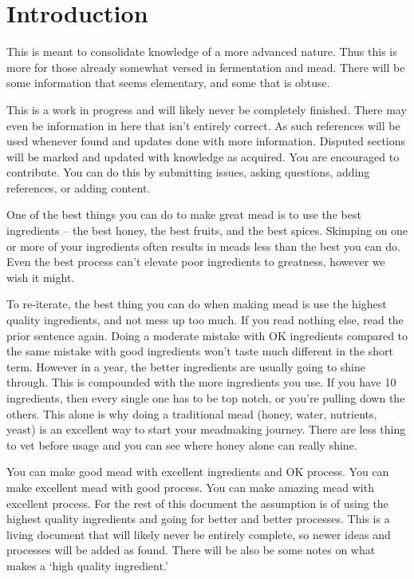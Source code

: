 \section{Introduction}
 This is meant to consolidate knowledge of a more advanced nature. Thus this is more for those already somewhat 
 versed in fermentation and mead. There will be some information that seems elementary, and some that is obtuse.

 This is a work in progress and will likely never be completely finished. There may even be information in
 here that isn't entirely correct. As such references will be used whenever found and updates done with more 
 information. Disputed sections will be marked and updated with knowledge as acquired. You are encouraged to 
 contribute. You can do this by submitting issues, asking questions, adding references, or adding content.

 One of the best things you can do to make great mead is to use the best ingredients -- the best honey, the best 
 fruits, and the best spices. Skimping on one or more of your ingredients often results in meads less than the 
 best you can do. Even the best process can't elevate poor ingredients to greatness, however we wish it might.

 To re-iterate, the best thing you can do when making mead is use the highest quality ingredients, and not mess
 up too much. If you read nothing else, read the prior sentence again. Doing a moderate mistake with OK ingredients
 compared to the same mistake with good ingredients won't taste much different in the short term. However in a
 year, the better ingredients are usually going to shine through. This is compounded with the more ingredients you
 use. If you have 10 ingredients, then every single one has to be top notch, or you're pulling down the others.
 This alone is why doing a traditional mead (honey, water, nutrients, yeast) is an excellent way to start your
 meadmaking journey. There are less thing to vet before usage and you can see where honey alone can really shine.

 You can make good mead with excellent ingredients and OK process. You can make excellent mead with good process. You
 can make amazing mead with excellent process. For the rest of this document the assumption is of using the highest
 quality ingredients and going for better and better processes. This is a living document that will likely never 
 be entirely complete, so newer ideas and processes will be added as found.
 There will be also be some notes on what makes a `high quality ingredient.'